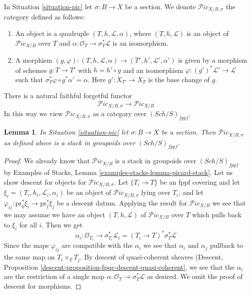 \documentclass{stacks-project}
\theoremstyle{plain}
\newtheorem{lemma}[subsection]{Lemma}
\theoremstyle{definition}
\theoremstyle{remark}
\numberwithin{equation}{subsection}
\def\Sch{\mathit{Sch}}
\def\Picardstack{\mathcal{P}\!\mathit{ic}}
\begin{document}
\noindent
In Situation \ref{situation-pic} let $\sigma : B \to X$ be a section.
We denote $\Picardstack_{X/B, \sigma}$ the category defined as follows:
\begin{enumerate}
\item An object is a quadruple $(T, h, \mathcal{L}, \alpha)$, where
$(T, h, \mathcal{L})$ is an object of $\Picardstack_{X/B}$ over $T$ and
$\alpha : \mathcal{O}_T \to \sigma_T^*\mathcal{L}$
is an isomorphism.
\item A morphism $(g, \varphi) : (T, h, \mathcal{L}, \alpha)
\to (T', h', \mathcal{L}', \alpha')$
is given by a morphism of schemes $g : T \to T'$ with $h = h' \circ g$
and an isomorphism $\varphi : (g')^*\mathcal{L}' \to \mathcal{L}$
such that $\sigma_T^*\varphi \circ g^*\alpha' = \alpha$.
Here $g' : X_{T'} \to X_T$ is the base change of $g$.
\end{enumerate}
There is a natural faithful forgetful functor
$$
\Picardstack_{X/B, \sigma} \longrightarrow
\Picardstack_{X/B}
$$
In this way we view $\Picardstack_{X/B, \sigma}$ as a category
over $(\Sch/S)_{fppf}$.

\begin{lemma}
\label{lemma-pic-with-section-stack}
In Situation \ref{situation-pic} let $\sigma : B \to X$ be a section.
Then $\Picardstack_{X/B, \sigma}$ as defined above is a stack in
groupoids over $(\Sch/S)_{fppf}$.
\end{lemma}

\begin{proof}
We already know that $\Picardstack_{X/B}$ is a stack in groupoids
over $(\Sch/S)_{fppf}$ by
Examples of Stacks, Lemma \ref{examples-stacks-lemma-picard-stack}.
Let us show descent for objects for $\Picardstack_{X/B, \sigma}$.
Let $\{T_i \to T\}$ be an fppf covering and let
$\xi_i = (T_i, h_i, \mathcal{L}_i, \alpha_i)$ be an object of
$\Picardstack_{X/B, \sigma}$ lying over $T_i$, and let
$\varphi_{ij} : \text{pr}_0^*\xi_i \to \text{pr}_1^*\xi_j$
be a descent datum. Applying the result for $\Picardstack_{X/B}$
we see that we may assume we have an object $(T, h, \mathcal{L})$
of $\Picardstack_{X/B}$ over $T$ which pulls back to $\xi_i$ for all $i$.
Then we get
$$
\alpha_i : \mathcal{O}_{T_i} \to \sigma_{T_i}^*\mathcal{L}_i =
(T_i \to T)^*\sigma_T^*\mathcal{L}
$$
Since the maps $\varphi_{ij}$ are compatible with the $\alpha_i$
we see that $\alpha_i$ and $\alpha_j$ pullback to the same map
on $T_i \times_T T_j$. By descent of quasi-coherent sheaves
(Descent, Proposition \ref{descent-proposition-fpqc-descent-quasi-coherent},
we see that the $\alpha_i$ are the restriction of a single map
$\alpha : \mathcal{O}_T \to \sigma_T^*\mathcal{L}$ as desired.
We omit the proof of descent for morphisms.
\end{proof}
\end{document}
